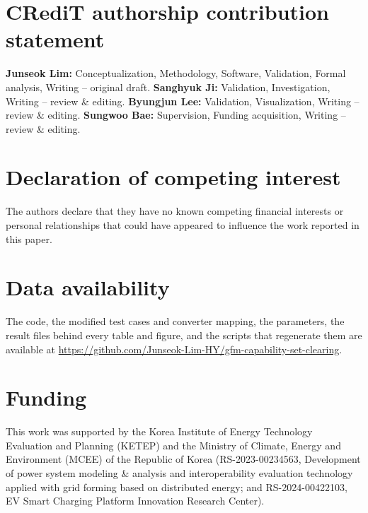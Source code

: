 \documentclass[final,5p,times,twocolumn]{elsarticle}
\begin{document}



\section*{CRediT authorship contribution statement}

\textbf{Junseok Lim:} Conceptualization, Methodology, Software, Validation,
Formal analysis, Writing -- original draft. \textbf{Sanghyuk Ji:} Validation,
Investigation, Writing -- review \& editing. \textbf{Byungjun Lee:}
Validation, Visualization, Writing -- review \& editing. \textbf{Sungwoo
Bae:} Supervision, Funding acquisition, Writing -- review \& editing.

\section*{Declaration of competing interest}

The authors declare that they have no known competing financial interests or
personal relationships that could have appeared to influence the work
reported in this paper.

\section*{Data availability}

The code, the modified test cases and converter mapping, the parameters, the
result files behind every table and figure, and the scripts that regenerate
them are available at
\url{https://github.com/Junseok-Lim-HY/gfm-capability-set-clearing}.

\section*{Funding}

This work was supported by the Korea Institute of Energy Technology Evaluation and Planning (KETEP) and the Ministry of Climate, Energy and Environment (MCEE) of the Republic of Korea (RS-2023-00234563, Development of power system modeling \& analysis and interoperability evaluation technology applied with grid forming based on distributed energy; and RS-2024-00422103, EV Smart Charging Platform Innovation Research Center).



\end{document}
